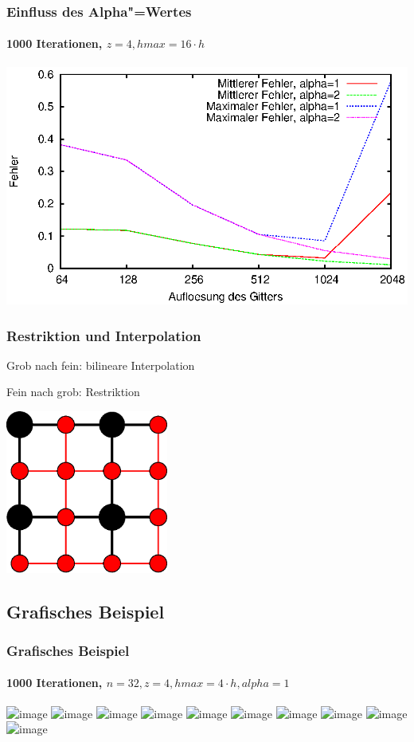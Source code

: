 \documentclass{beamer}
\begin{document}
\begin{frame}
    \frametitle{Einfluss des Alpha"=Wertes}
    \framesubtitle{1000 Iterationen, $z = 4, hmax = 16 \cdot h$}
    \includegraphics[width=\textwidth]{plots/fehlermehrgitter}
\end{frame}

\begin{frame}
    \frametitle{Restriktion und Interpolation}
    Grob nach fein: bilineare Interpolation
    
    Fein nach grob: Restriktion
    \begin{center}
        \includegraphics[width=0.4\textwidth]{interpolation}
    \end{center}
\end{frame}

\subsection{Grafisches Beispiel}
\begin{frame}
    \frametitle{Grafisches Beispiel}
    \framesubtitle{1000 Iterationen, $n=32, z=4, hmax=4 \cdot h, alpha=1$}
    \includegraphics<1>[trim=25 0 25 0, clip, width=\textwidth]{plots/000}
    \includegraphics<2>[trim=25 0 25 0, clip, width=\textwidth]{plots/001}
    \includegraphics<3>[trim=25 0 25 0, clip, width=\textwidth]{plots/002}
    \includegraphics<4>[trim=25 0 25 0, clip, width=\textwidth]{plots/003}
    \includegraphics<5>[trim=25 0 25 0, clip, width=\textwidth]{plots/004}
    \includegraphics<6>[trim=25 0 25 0, clip, width=\textwidth]{plots/005}
    \includegraphics<7>[trim=25 0 25 0, clip, width=\textwidth]{plots/006}
    \includegraphics<8>[trim=25 0 25 0, clip, width=\textwidth]{plots/007}
    \includegraphics<9>[trim=25 0 25 0, clip, width=\textwidth]{plots/008}
    \includegraphics<10>[trim=25 0 25 0, clip, width=\textwidth]{plots/009}
\end{frame}
\end{document}
